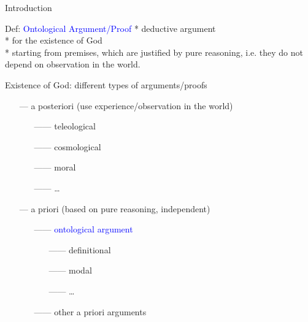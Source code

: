 \begin{frame}{Introduction}\large
\begin{block}{Def: \textcolor{blue}{Ontological Argument/Proof}}
* deductive argument \\

* for the existence of God \\

* starting from premises, which are justified by pure reasoning,
i.e. they do not depend on observation in the world.
\end{block}

\vfill \pause
Existence of God: different types of arguments/proofs\\[.2em]
\begin{itemize}
\item[---]a posteriori (use experience/observation in the world)
  \begin{itemize}
  \item[------]teleological
  \item[------]cosmological
  \item[------]moral
  \item[------] \ldots
  \end{itemize}  
\item[---]a priori (based on pure reasoning, independent)
  \begin{itemize}
  \item[------]\textcolor{blue}{ontological argument}
    \begin{itemize}
    \item[------]definitional 
    \item[------]modal 
    \item[------] \ldots
    \end{itemize}
  \item[------]other a priori arguments
  \end{itemize}
\end{itemize}
\end{frame}

